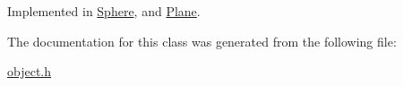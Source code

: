 Implemented in \mbox{\hyperlink{class_sphere_a95537121c5308b7b250f4a53171303ef}{Sphere}}, and \mbox{\hyperlink{class_plane_a3d9139793b931279e3dcd1fd80a263c7}{Plane}}.



The documentation for this class was generated from the following file\+:\begin{DoxyCompactItemize}
\item 
\mbox{\hyperlink{object_8h}{object.\+h}}\end{DoxyCompactItemize}
